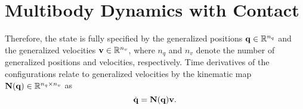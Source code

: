 
\section{Multibody Dynamics with Contact}
\label{sec:multibody_dynamics_with_contact}

 Therefore, the state is fully
specified by the generalized positions ${\mathbf{q}}\in\mathbb{R}^{n_q}$ and the
generalized velocities ${\mathbf{v}}\in\mathbb{R}^{n_v}$, where $n_q$ and $n_v$ denote
the number of generalized positions and velocities, respectively. Time
derivatives of the configurations relate to generalized velocities by the
kinematic map ${\mathbf{N}}({\mathbf{q}})\in\mathbb{R}^{n_q\times n_v}$ as
\begin{equation}
    \dot{\mf{q}}=\mf{N}(\mf{q})\mf{v}.
    \label{eq:v_to_qdot}
\end{equation}





